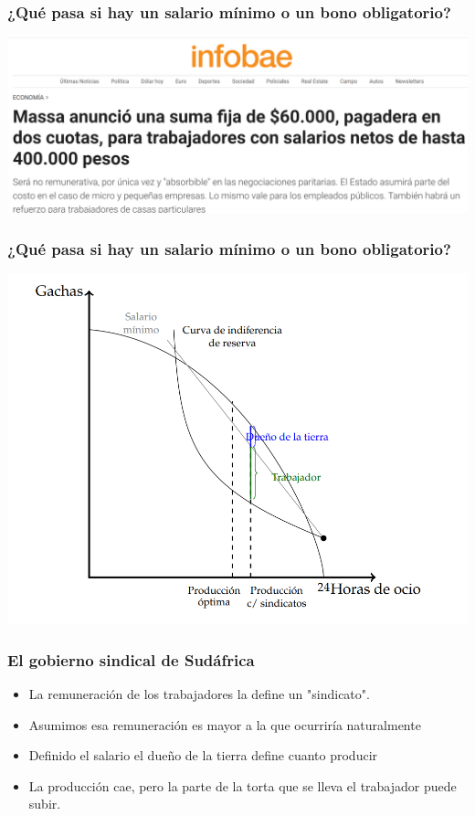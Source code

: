 \documentclass{beamer}
\begin{document}
\begin{frame}
\frametitle{¿Qué pasa si hay un salario mínimo o un bono obligatorio?}
\centering
\includegraphics[scale=0.33]{Slides Principios de Economia/Figures/InstitucionesBono.png}
\end{frame}

\begin{frame}
\frametitle{¿Qué pasa si hay un salario mínimo o un bono obligatorio?}
\centering
\includegraphics[scale=0.8]{Slides Principios de Economia/Figures/Salariominimo.png}
\end{frame}

\begin{frame}
\frametitle{El gobierno sindical de Sudáfrica}
\begin{itemize}
    \item La remuneración de los trabajadores la define un "sindicato". 
    \item  Asumimos esa remuneración es mayor a la que ocurriría naturalmente
    \item Definido el salario el dueño de la tierra define cuanto producir
    \item  La producción cae, pero la parte de la torta que se lleva el trabajador puede subir. 
\end{itemize}
\end{frame}
\end{document}
